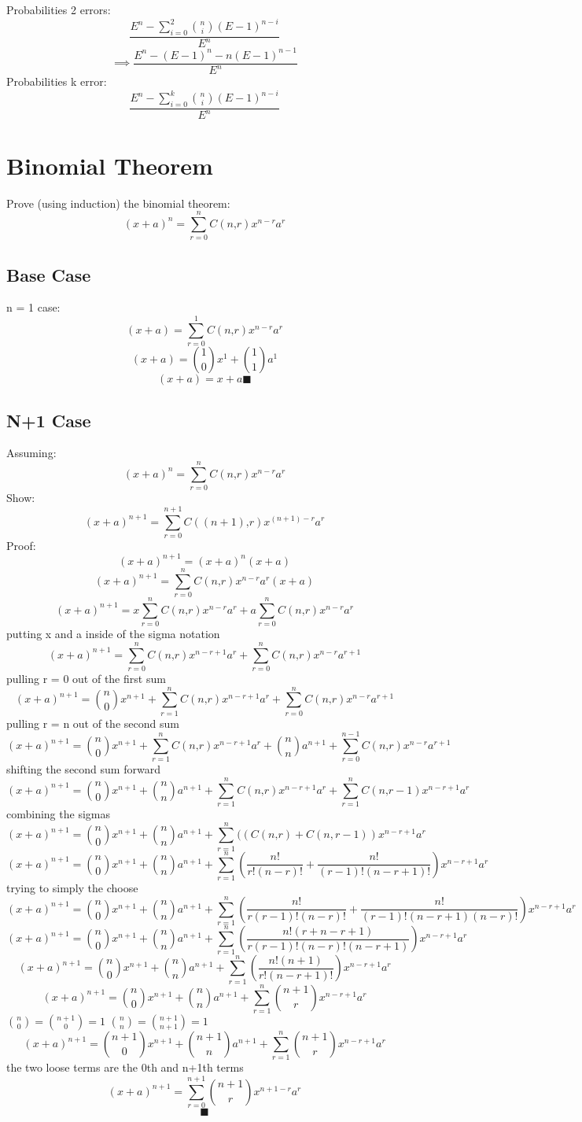 \documentclass[a4paper,12pt]{article}
\begin{document}
Probabilities 2 errors: \\
\[\frac{ E^n - \sum ^2 _{i=0} \binom{n}{i}(E-1)^{n-i}} {E^n}\]
\[\implies \frac{ E^n - (E-1)^{n} - n(E-1)^{n-1} }{E^n}\]
Probabilities k error: \\
\[\frac{ E^n - \sum ^k _{i=0} \binom{n}{i}(E-1)^{n-i}} {E^n}\]
\pagebreak
\section{Binomial Theorem}
Prove (using induction) the binomial theorem:
\[
(x+a)^n = \sum_{r=0}^n C(n‚ r)x^{n-r}a^r
\]
\subsection{Base Case}
n = 1 case:\\
\[(x+a) = \sum_{r=0}^1 C(n‚ r)x^{n-r}a^r\]
\[(x+a) = \binom{1}{0} x^{1} + \binom{1}{1}  a^1\]
\[(x+a) = x+a \blacksquare \]
\subsection{N+1 Case}
Assuming:
\[
(x+a)^n = \sum_{r=0}^n C(n‚ r)x^{n-r}a^r
\]
Show:
\[(x+a)^{n+1} = \sum_{r=0}^{n+1} C((n+1)‚ r)x^{(n+1)-r}a^r\]
Proof:
\[(x+a)^{n+1} =  (x+a)^n (x+a)\]
\[(x+a)^{n+1} =  \sum_{r=0}^n C(n‚ r)x^{n-r}a^r (x+a)\]
\[(x+a)^{n+1} =  x\sum_{r=0}^n C(n‚ r)x^{n-r}a^r + a\sum_{r=0}^n C(n‚ r)x^{n-r}a^{r}\] 
putting x and a inside of the sigma notation
\[(x+a)^{n+1} =  \sum_{r=0}^n C(n‚ r)x^{n-r+1}a^r + \sum_{r=0}^n C(n‚ r)x^{n-r}a^{r+1}\] 
pulling r = 0 out of the first sum
\[(x+a)^{n+1} =  \binom{n}{0} x^{n+1}+\sum_{r=1}^n C(n‚ r)x^{n-r+1}a^r + \sum_{r=0}^n C(n‚ r)x^{n-r}a^{r+1}\] 
pulling r = n out of the second sum
\[(x+a)^{n+1} =  \binom{n}{0} x^{n+1}+ \sum_{r=1}^n C(n‚ r)x^{n-r+1}a^r + \binom{n}{n}a^{n+1}+\sum_{r=0}^{n-1} C(n‚ r)x^{n-r}a^{r+1}\] 
shifting the second sum forward 
\[(x+a)^{n+1} =  \binom{n}{0} x^{n+1}+\binom{n}{n}a^{n+1}+ \sum_{r=1}^n C(n‚ r)x^{n-r+1}a^r + \sum_{r=1}^{n} C(n‚ r-1)x^{n-r+1}a^{r}\] 
combining the sigmas
\[(x+a)^{n+1} =  \binom{n}{0} x^{n+1}+\binom{n}{n}a^{n+1}+ \sum_{r=1}^n ((C(n‚ r)+C(n,r-1) )x^{n-r+1}a^r\]
\[(x+a)^{n+1} =  \binom{n}{0} x^{n+1}+\binom{n}{n}a^{n+1}+ \sum_{r=1}^n (\frac{n!}{r!(n-r)!}+\frac{n!}{(r-1)!(n-r+1)!} )x^{n-r+1}a^r\]
trying to simply the choose
\[(x+a)^{n+1} =  \binom{n}{0} x^{n+1}+\binom{n}{n}a^{n+1}+ \sum_{r=1}^n (\frac{n!}{r(r-1)!(n-r)!}+\frac{n!}{(r-1)!(n-r+1)(n-r)!} )x^{n-r+1}a^r\]
\[(x+a)^{n+1} =  \binom{n}{0} x^{n+1}+\binom{n}{n}a^{n+1}+ \sum_{r=1}^n (\frac{n!(r+n-r+1)}{r(r-1)!(n-r)!(n-r+1)})x^{n-r+1}a^r\]
\[(x+a)^{n+1} =  \binom{n}{0} x^{n+1}+\binom{n}{n}a^{n+1}+ \sum_{r=1}^n (\frac{n!(n+1)}{r!(n-r+1)!})x^{n-r+1}a^r\]
\[(x+a)^{n+1} =  \binom{n}{0} x^{n+1}+\binom{n}{n}a^{n+1}+ \sum_{r=1}^n \binom{n+1}{r}x^{n-r+1}a^r\]
$\binom{n}{0} = \binom{n+1}{0} = 1$
$\binom{n}{n} = \binom{n+1}{n+1} = 1$
\[(x+a)^{n+1} =  \binom{n+1}{0} x^{n+1}+\binom{n+1}{n}a^{n+1}+ \sum_{r=1}^n \binom{n+1}{r}x^{n-r+1}a^r\]
the two loose terms are the 0th and n+1th terms
\[(x+a)^{n+1} =  \sum_{r=0}^{n+1} \binom{n+1}{r}x^{n+1-r}a^r\]
\[\blacksquare\]
\pagebreak
\end{document}
